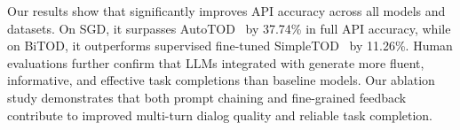 Our results show that {\ours} significantly improves API accuracy across all models and datasets. On SGD, it surpasses AutoTOD~\cite{hosseini2020simple} by 37.74\% in full API accuracy, while on BiTOD, it outperforms supervised fine-tuned SimpleTOD~\cite{xu-etal-2024-rethinking} by 11.26\%. 
Human evaluations further confirm that LLMs integrated with {\ours} generate more fluent, informative, and effective task completions than baseline models. 
Our ablation study demonstrates that both prompt chaining and fine-grained feedback contribute to improved multi-turn dialog quality and reliable task completion.



